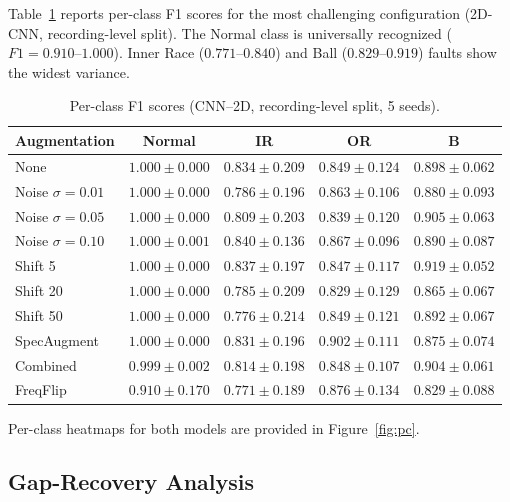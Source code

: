 ﻿\documentclass[11pt,a4paper]{article}
\begin{document}
Table~\ref{tab:perclass} reports per-class F1 scores for the most challenging configuration (2D-CNN, recording-level split). The Normal class is universally recognized ($F1=0.910$--$1.000$). Inner Race ($0.771$--$0.840$) and Ball ($0.829$--$0.919$) faults show the widest variance.

\begin{table}[H]
\centering
\caption{Per-class F1 scores (CNN--2D, recording-level split, 5 seeds).}
\label{tab:perclass}
\begin{tabular}{lcccc}
\toprule
Augmentation & Normal & IR & OR & B \\ \midrule
None          & $1.000 \pm 0.000$ & $0.834 \pm 0.209$ & $0.849 \pm 0.124$ & $0.898 \pm 0.062$ \\
Noise $\sigma=0.01$ & $1.000 \pm 0.000$ & $0.786 \pm 0.196$ & $0.863 \pm 0.106$ & $0.880 \pm 0.093$ \\
Noise $\sigma=0.05$ & $1.000 \pm 0.000$ & $0.809 \pm 0.203$ & $0.839 \pm 0.120$ & $0.905 \pm 0.063$ \\
Noise $\sigma=0.10$ & $1.000 \pm 0.001$ & $0.840 \pm 0.136$ & $0.867 \pm 0.096$ & $0.890 \pm 0.087$ \\
Shift 5       & $1.000 \pm 0.000$ & $0.837 \pm 0.197$ & $0.847 \pm 0.117$ & $\mathbf{0.919 \pm 0.052}$ \\
Shift 20      & $1.000 \pm 0.000$ & $0.785 \pm 0.209$ & $0.829 \pm 0.129$ & $0.865 \pm 0.067$ \\
Shift 50      & $1.000 \pm 0.000$ & $0.776 \pm 0.214$ & $0.849 \pm 0.121$ & $0.892 \pm 0.067$ \\
SpecAugment   & $1.000 \pm 0.000$ & $0.831 \pm 0.196$ & $0.902 \pm 0.111$ & $0.875 \pm 0.074$ \\
Combined      & $0.999 \pm 0.002$ & $0.814 \pm 0.198$ & $0.848 \pm 0.107$ & $0.904 \pm 0.061$ \\
FreqFlip      & $0.910 \pm 0.170$ & $0.771 \pm 0.189$ & $0.876 \pm 0.134$ & $0.829 \pm 0.088$ \\
\bottomrule
\end{tabular}
\end{table}

Per-class heatmaps for both models are provided in Figure~\ref{fig:pc}.

\subsection{Gap-Recovery Analysis}
\end{document}
